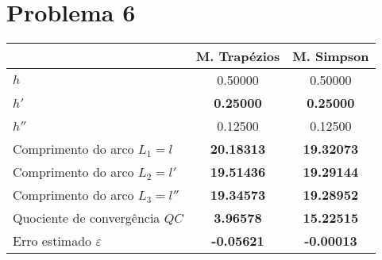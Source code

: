 {\section{Problema 6}


\begin{center}
    \begin{tabular}{l | c | c}
                                       & M. Trapézios & M. Simpson \\ \hline
        $h  $                          & 0.50000     &    0.50000 \\
        $h' $                          & \textbf{0.25000}     &    \textbf{0.25000} \\
        $h''$                          & 0.12500     &    0.12500 \\
        Comprimento do arco $L_1=l$    & \textbf{20.18313}    &    \textbf{19.32073} \\
        Comprimento do arco $L_2=l'$   & \textbf{19.51436}    &    \textbf{19.29144} \\
        Comprimento do arco $L_3=l''$  & \textbf{19.34573}    &    \textbf{19.28952} \\
        Quociente de convergência $QC$ & \textbf{3.96578}     &    \textbf{15.22515} \\
        Erro estimado $\varepsilon$    & \textbf{-0.05621}    &    \textbf{-0.00013}
    \end{tabular}
\end{center}
}